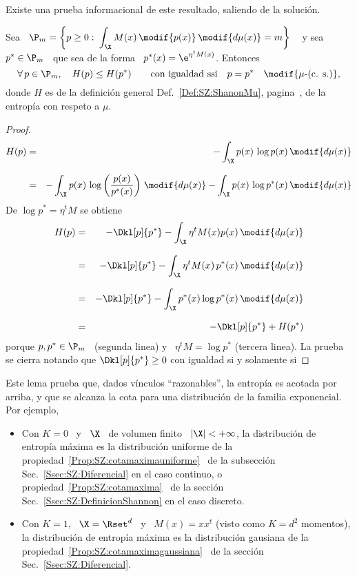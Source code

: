 Existe   una  prueba   informacional   de  este   resultado,   saliendo  de   la
soluci\'on.
%
\begin{lema}\label{Lem:SZ:MaxEntPruebaInfo}
  Sea \ $\displaystyle  \P_m = \left\{ p \ge 0: \:  \int_\X M(x) \, \modif{p(x)}
    \, \modif{d\mu(x)} = m \right\}$ \  y sea \ $p^* \in  \P_m$ \ que sea de
  la forma \ $p^*(x) = \e^{\eta^t M(x)}$. Entonces
  \[
  \forall \,  p \in \P_m, \quad  H(p) \le H(p^*) \qquad  \mbox{con igualdad ssi}
  \quad p = p^* \quad \modif{\mu\mbox{-(c. s.)}},
  \]
  donde   $H$  es   de  la   definici\'on   general  Def.~\ref{Def:SZ:ShanonMu},
  pagina~\pageref{Def:SZ:ShanonMu}, de la entrop\'ia con respeto a $\mu$.
\end{lema}
\begin{proof}
  \begin{eqnarray*}
  H(p) & = & - \int_\X p(x) \, \log p(x) \, \modif{d\mu(x)}\\[2.5mm]
  & = & - \int_\X p(x) \, \log\left( \frac{p(x)}{p^*(x)} \right) \, \modif{d\mu(x)} - \int_\X
  p(x) \, \log p^*(x) \, \modif{d\mu(x)}
  \end{eqnarray*}
  De $\log p^* = \eta^t M$ se obtiene
  \begin{eqnarray*}
  H(p) & = & - \Dkl[p]{p^*} - \int_\X \eta^t M(x) p(x)
  \, \modif{d\mu(x)}\\[2.5mm]
  & = & - \Dkl[p]{p^*} - \int_\X \eta^t M(x) \, p^*(x) \, \modif{d\mu(x)}\\[2.5mm]
  & = & - \Dkl[p]{p^*} - \int_\X p^*(x) \log p^*(x) \, \modif{d\mu(x)}\\[2.5mm]
  & = & - \Dkl[p]{p^*} + H(p^*)
  \end{eqnarray*}
  porque $p, p^* \in \P_m$ \ (segunda  linea) y \ $\eta^t M = \log p^*$ (tercera
  linea). La prueba se cierra notando que $\Dkl[p]{p^*} \ge 0$ con igualdad si y
  solamente si 
\end{proof}
%
Este lema prueba que, dados  v\'inculos ``razonables'', la entrop\'ia es acotada
por  arriba, y que  se alcanza  la cota  para una  distribuci\'on de  la familia
exponencial. Por ejemplo,
%
\begin{itemize}
\item Con  $K =  0$ \  y \  $\X$ \ de  volumen finito  \ $|\X|  < +  \infty$, la
  distribuci\'on  de entrop\'ia  m\'axima es  la distribuci\'on  uniforme  de la
  propiedad~\ref{Prop:SZ:cotamaximauniforme}      \     de      la     subsecci\'on
  Sec.~\ref{Ssec:SZ:Diferencial}      en       el      caso      continuo,      o
  propiedad~\ref{Prop:SZ:cotamaxima}        \       de        la       secci\'on
  Sec.~\ref{Ssec:SZ:DefinicionShannon} en el caso discreto.
%
\item Con $K = 1$,  \ $\X = \Rset^d$ \ y \ $M(x) = x  x^t$ (visto como $K = d^2$
  momentos),  la  distribuci\'on de  entrop\'ia  m\'axima  es la  distribuci\'on
  gausiana de  la propiedad~\ref{Prop:SZ:cotamaximagaussiana} \  de la secci\'on
  Sec.~\ref{Ssec:SZ:Diferencial}.
\end{itemize}
